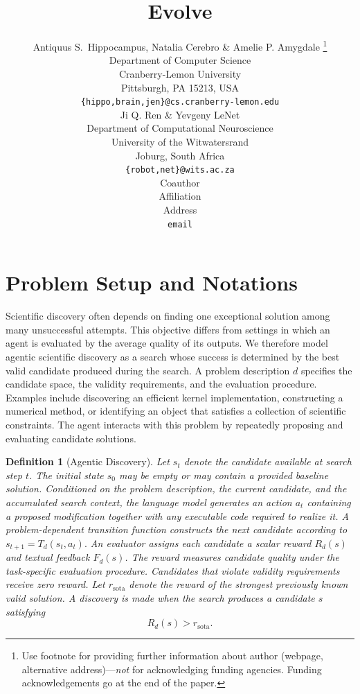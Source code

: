 \documentclass{article} %
\title{Evolve}
\author{Antiquus S.~Hippocampus, Natalia Cerebro \& Amelie P. Amygdale \thanks{ Use footnote for providing further information
about author (webpage, alternative address)---\emph{not} for acknowledging
funding agencies.  Funding acknowledgements go at the end of the paper.} \\
Department of Computer Science\\
Cranberry-Lemon University\\
Pittsburgh, PA 15213, USA \\
\texttt{\{hippo,brain,jen\}@cs.cranberry-lemon.edu} \\
\And
Ji Q. Ren \& Yevgeny LeNet \\
Department of Computational Neuroscience \\
University of the Witwatersrand \\
Joburg, South Africa \\
\texttt{\{robot,net\}@wits.ac.za} \\
\AND
Coauthor \\
Affiliation \\
Address \\
\texttt{email}
}
\newtheorem{definition}{Definition}
\newcommand{\sota}{\mathrm{sota}}
\begin{document}
\maketitle

\begin{abstract}
\cite{Bengio+chapter2007}
\end{abstract}




\section{Problem Setup and Notations}
\label{sec_setup}

Scientific discovery often depends on finding one exceptional solution among many unsuccessful attempts. This objective differs from settings in which an agent is evaluated by the average quality of its outputs. We therefore model agentic scientific discovery as a search whose success is determined by the best valid candidate produced during the search.
A problem description $d$ specifies the candidate space, the validity requirements, and the evaluation procedure. Examples include discovering an efficient kernel implementation, constructing a numerical method, or identifying an object that satisfies a collection of scientific constraints. The agent interacts with this problem by repeatedly proposing and evaluating candidate solutions.

\begin{definition}[Agentic Discovery]
\label{def:sci}
Let $s_t$ denote the candidate available at search step $t$. The initial state $s_0$ may be empty or may contain a provided baseline solution. Conditioned on the problem description, the current candidate, and the accumulated search context, the language model generates an action $a_t$ containing a proposed modification together with any executable code required to realize it. A problem-dependent transition function constructs the next candidate according to
$s_{t+1} = T_d(s_t, a_t).$
An evaluator assigns each candidate a scalar reward $R_d(s)$ and textual feedback $F_d(s)$. The reward measures candidate quality under the task-specific evaluation procedure. Candidates that violate validity requirements receive zero reward. Let $r_{\sota}$ denote the reward of the strongest previously known valid solution. A discovery is made when the search produces a candidate $s$ satisfying
\begin{equation}
R_d(s) > r_{\sota}.
\end{equation}
\end{definition}
\end{document}
